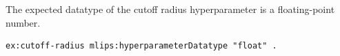 The expected datatype of the cutoff radius hyperparameter is a floating-point number.
\begin{lstlisting}[language=turtle]
ex:cutoff-radius mlips:hyperparameterDatatype "float" .
\end{lstlisting}
